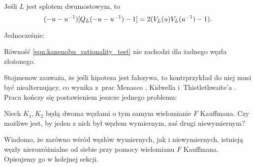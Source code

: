\begin{proposition}
    Jeśli $L$ jest splotem dwumostowym, to
    \begin{equation}
\label{eqn:kanenobu_rationality_test}%
        (-u-u^{-1}) [Q_L(-u-u^{-1})-1] = 2 (\jones_L(u) \jones_L (u^{-1}) - 1).
    \end{equation}
\end{proposition}

Jednocześnie:

\begin{conjecture}
%
    Równość \ref{eqn:kanenobu_rationality_test} nie zachodzi dla żadnego węzła złożonego.
\end{conjecture}

Stojmenow \cite[s. 474]{stoimenow2000} zauważa, że jeśli hipoteza jest fałszywa, to kontrprzykład do niej musi być niealternujący, co wynika z~prac Menasco \cite{menasco1984}, Kidwella \cite{kidwell1987} i~Thistlethwaite'a \cite{thistlethwaite1987}.
%
%
%
%
Praca \cite[s. 477]{stoimenow2000} kończy się postawieniem jeszcze jednego problemu:

\begin{conjecture}
    Niech $K_1, K_2$ będą dwoma węzłami o tym samym wielomianie $F$ Kauffmana.
    Czy możliwe jest, by jeden z nich był węzłem wymiernym, zaś drugi niewymiernym?
\end{conjecture}

Wiadomo, że zarówno wśród węzłów wymiernych, jak i niewymiernych, istnieją węzły nierozróżnialne od siebie przy pomocy wielomianu $F$ Kauffmana.
Opisujemy go w kolejnej sekcji.

%


